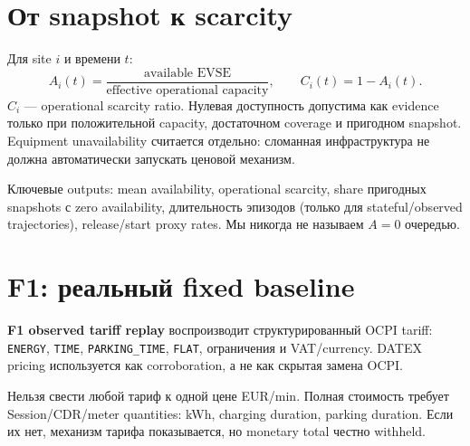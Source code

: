 \documentclass[11pt,a4paper]{article}
\newcommand{\term}[1]{\textbf{#1}}
\newcommand{\code}[1]{\texttt{#1}}
\begin{document}
\section{От snapshot к scarcity}
Для site $i$ и времени $t$:
\[
A_i(t)=\frac{\text{available EVSE}}{\text{effective operational capacity}},\qquad
C_i(t)=1-A_i(t).
\]
$C_i$ --- operational scarcity ratio. Нулевая доступность допустима как evidence только при положительной capacity, достаточном coverage и пригодном snapshot. Equipment unavailability считается отдельно: сломанная инфраструктура не должна автоматически запускать ценовой механизм.

Ключевые outputs: mean availability, operational scarcity, share пригодных snapshots с zero availability, длительность эпизодов (только для stateful/observed trajectories), release/start proxy rates. Мы никогда не называем $A=0$ очередью.

\section{F1: реальный fixed baseline}
\term{F1 observed tariff replay} воспроизводит структурированный OCPI tariff: \code{ENERGY}, \code{TIME}, \code{PARKING\_TIME}, \code{FLAT}, ограничения и VAT/currency. DATEX pricing используется как corroboration, а не как скрытая замена OCPI.

Нельзя свести любой тариф к одной цене EUR/min. Полная стоимость требует Session/CDR/meter quantities: kWh, charging duration, parking duration. Если их нет, механизм тарифа показывается, но monetary total честно withheld.
\end{document}
